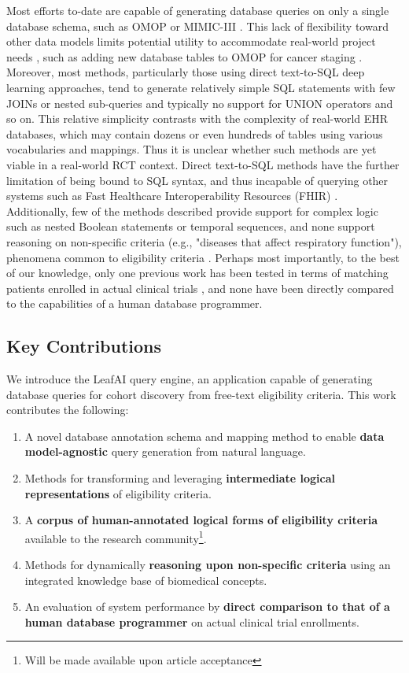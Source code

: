 \documentclass[../main.tex]{subfiles}
\begin{document}
Most efforts to-date are capable of generating database queries on only a single database schema, such as OMOP or MIMIC-III \cite{johnson2016mimic}. This lack of flexibility toward other data models limits potential utility to accommodate real-world project needs \cite{belenkaya2021extending, peng2021towards, zoch2021adaption, warner2019hemonc, zhou2013evaluation, shin2019genomic, kwon2019development}, such as adding new database tables to OMOP for cancer staging \cite{belenkaya2021extending}. Moreover, most methods, particularly those using direct text-to-SQL deep learning approaches, tend to generate relatively simple SQL statements with few JOINs or nested sub-queries and typically no support for UNION operators and so on. This relative simplicity contrasts with the complexity of real-world EHR databases, which may contain dozens or even hundreds of tables using various vocabularies and mappings. Thus it is unclear whether such methods are yet viable in a real-world RCT context. Direct text-to-SQL methods have the further limitation of being bound to SQL syntax, and thus incapable of querying other systems such as Fast Healthcare Interoperability Resources (FHIR) \cite{bender2013hl7}. Additionally, few of the methods described provide support for complex logic such as nested Boolean statements or temporal sequences, and none support reasoning on non-specific criteria (e.g., "diseases that affect respiratory function"), phenomena common to eligibility criteria \cite{wang2017classifying, ross2010analysis}. Perhaps most importantly, to the best of our knowledge, only one previous work has been tested in terms of matching patients enrolled in actual clinical trials \cite{zhang2020deepenroll}, and none have been directly compared to the capabilities of a human database programmer.

\subsection*{Key Contributions}

We introduce the LeafAI query engine, an application capable of generating database queries for cohort discovery from free-text eligibility criteria. This work contributes the following:

\begin{enumerate}
    \item{A novel database annotation schema and mapping method to enable \textbf{data model-agnostic} query generation from natural language.}
    \item{Methods for transforming and leveraging \textbf{intermediate logical representations} of eligibility criteria.}
    \item{A \textbf{corpus of human-annotated logical forms of eligibility criteria} available to the research community\footnote{Will be made available upon article acceptance}.}
    \item{Methods for dynamically \textbf{reasoning upon non-specific criteria} using an integrated knowledge base of biomedical concepts.}
    \item{An evaluation of system performance by \textbf{direct comparison to that of a human database programmer} on actual clinical trial enrollments}.
\end{enumerate}
\end{document}
